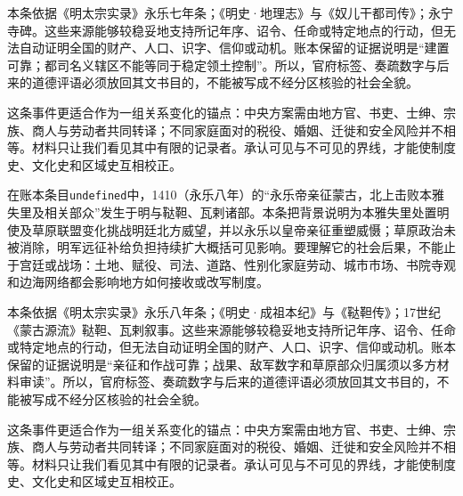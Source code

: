 本条依据《明太宗实录》永乐七年条；《明史·地理志》与《奴儿干都司传》；永宁寺碑。这些来源能够较稳妥地支持所记年序、诏令、任命或特定地点的行动，但无法自动证明全国的财产、人口、识字、信仰或动机。账本保留的证据说明是“建置可靠；都司名义辖区不能等同于稳定领土控制”。所以，官府标签、奏疏数字与后来的道德评语必须放回其文书目的，不能被写成不经分区核验的社会全貌。

这条事件更适合作为一组关系变化的锚点：中央方案需由地方官、书吏、士绅、宗族、商人与劳动者共同转译；不同家庭面对的税役、婚姻、迁徙和安全风险并不相等。材料只让我们看见其中有限的记录者。承认可见与不可见的界线，才能使制度史、文化史和区域史互相校正。

在账本条目\texttt{undefined}中，1410（永乐八年）的“永乐帝亲征蒙古，北上击败本雅失里及相关部众”发生于明与鞑靼、瓦剌诸部。本条把背景说明为本雅失里处置明使及草原联盟变化挑战明廷北方威望，并以永乐以皇帝亲征重塑威慑；草原政治未被消除，明军远征补给负担持续扩大概括可见影响。要理解它的社会后果，不能止于宫廷或战场：土地、赋役、司法、道路、性别化家庭劳动、城市市场、书院寺观和边海网络都会影响地方如何接收或改写制度。

本条依据《明太宗实录》永乐八年条；《明史·成祖本纪》与《鞑靼传》；17世纪《蒙古源流》鞑靼、瓦剌叙事。这些来源能够较稳妥地支持所记年序、诏令、任命或特定地点的行动，但无法自动证明全国的财产、人口、识字、信仰或动机。账本保留的证据说明是“亲征和作战可靠；战果、敌军数字和草原部众归属须以多方材料审读”。所以，官府标签、奏疏数字与后来的道德评语必须放回其文书目的，不能被写成不经分区核验的社会全貌。

这条事件更适合作为一组关系变化的锚点：中央方案需由地方官、书吏、士绅、宗族、商人与劳动者共同转译；不同家庭面对的税役、婚姻、迁徙和安全风险并不相等。材料只让我们看见其中有限的记录者。承认可见与不可见的界线，才能使制度史、文化史和区域史互相校正。
